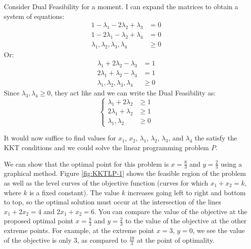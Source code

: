 Consider Dual Feasibility for a moment. I can expand the matrices to obtain a system of equations:
\begin{equation}
\begin{aligned}
1 - \lambda_1 - 2\lambda_2 + \lambda_3 & = 0\\
1 - 2\lambda_1 - \lambda_2 + \lambda_4 & = 0\\
\lambda_1,\lambda_2,\lambda_3,\lambda_4 & \geq 0
\end{aligned}
\end{equation}
Or:
\begin{equation}
\begin{aligned}
\lambda_1 + 2\lambda_2 - \lambda_3 &= 1\\
2\lambda_1 + \lambda_2 - \lambda_4 &= 1\\
\lambda_1,\lambda_2,\lambda_3,\lambda_4 & \geq 0
\end{aligned}
\end{equation}
Since $\lambda_3, \lambda_4 \geq 0$, they act like  and we can write the Dual Feasibility as:
\begin{equation}
\left\{
\begin{aligned}
\lambda_1 + 2\lambda_2 &\geq  1\\
2\lambda_1 + \lambda_2 &\geq 1\\
\lambda_1,\lambda_2& \geq 0
\end{aligned}\right.
\label{eqn:Lambda}
\end{equation}
\begin{remark} It would now suffice to find values for $x_1$, $x_2$, $\lambda_1$, $\lambda_2$, $\lambda_3$, and $\lambda_4$ the satisfy the KKT conditions and we could solve the linear programming problem $P$.
\end{remark}

We can show that the optimal point for this problem is $x = \tfrac{8}{3}$ and $y = \tfrac{2}{3}$ using a graphical method. Figure \ref{fig:KKTLP-1} shows the feasible region of the problem as well as the level curves of the objective function (curves for which $x_1 + x_2 = k$, where $k$ is a fixed constant). The value $k$ increases going left to right and bottom to top, so the optimal solution must occur at the intersection of the lines $x_1 + 2 x_2 = 4$ and $2x_1 + x_2 = 6$. You can compare the value of the objective at the proposed optimal point $x = \tfrac{8}{3}$ and $y = \tfrac{2}{3}$ to the value of the objective at the other extreme points. For example, at the extreme point $x = 3$, $y = 0$, we see the value of the objective is only $3$, as compared to $\tfrac{10}{3}$ at the point of optimality.


